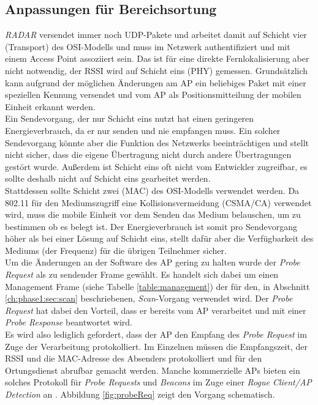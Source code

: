 \subsection{Anpassungen für Bereichsortung}
\label{ch:phase2:sec:anpassungbereich}
\emph{RADAR} versendet immer noch UDP-Pakete und arbeitet damit auf Schicht vier (Transport) des OSI-Modells und muss im Netzwerk authentifiziert und mit einem Access Point assoziiert sein.
Das ist für eine direkte Fernlokalisierung aber nicht notwendig, der RSSI wird auf Schicht eins (PHY) gemessen.
Grundsätzlich kann aufgrund der möglichen Änderungen am AP ein beliebiges Paket mit einer speziellen Kennung versendet und vom AP als Positionsmitteilung der mobilen Einheit erkannt werden. \\
Ein Sendevorgang, der nur Schicht eins nutzt hat einen geringeren Energieverbrauch, da er nur senden und nie empfangen muss.
Ein solcher Sendevorgang könnte aber die Funktion des Netzwerks beeinträchtigen und stellt nicht sicher, dass die eigene Übertragung nicht durch andere Übertragungen gestört wurde.
Außerdem ist Schicht eins oft nicht vom Entwickler zugreifbar, es sollte deshalb nicht auf Schicht eins gearbeitet werden.\\
Stattdessen sollte Schicht zwei (MAC) des OSI-Modells verwendet werden. 
Da 802.11 für den Mediumszugriff eine Kollisionsvermeidung (CSMA/CA) verwendet wird, muss die mobile Einheit vor dem Senden das Medium belauschen, um zu bestimmen ob es belegt ist.
Der Energieverbrauch ist somit pro Sendevorgang höher als bei einer Lösung auf Schicht eins, stellt dafür aber die Verfügbarkeit des Mediums (der Frequenz) für die übrigen Teilnehmer sicher. \\
Um die Änderungen an der Software des AP gering zu halten wurde der \emph{Probe Request} als zu sendender Frame gewählt.
Es handelt sich dabei um einen Management Frame (siehe Tabelle \ref{table:management}) der für den, in Abschnitt \ref{ch:phase1:sec:scan} beschriebenen, \emph{Scan}-Vorgang verwendet wird.
Der \emph{Probe Request} hat dabei den Vorteil, dass er bereits vom AP verarbeitet und mit einer \emph{Probe Response} beantwortet wird. \\
Es wird also lediglich gefordert, dass der AP den Empfang des \emph{Probe Request} im Zuge der Verarbeitung protokolliert. 
Im Einzelnen müssen die Empfangszeit, der RSSI und die MAC-Adresse des Absenders protokolliert und für den Ortungsdienst abrufbar gemacht werden. 
Manche kommerzielle APs bieten ein solches Protokoll für \emph{Probe Requests} und \emph{Beacons} im Zuge einer \textit{Rogue Client/AP Detection} an \cite{lancom2017rouge}.
Abbildung \ref{fig:probeReq} zeigt den Vorgang schematisch.\\

